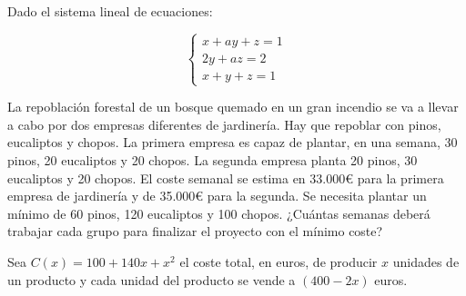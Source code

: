 \documentclass[addpoints,spanish, 12pt,a4paper]{exam}
\begin{document}
\begin{questions}

\question Dado  el sistema lineal de ecuaciones:

$$\left\{\begin{matrix}
    x + ay + z = 1 \\
    2y + az = 2 \\
    x+y+z=1
\end{matrix}\right.$$


\question[4] La repoblación forestal de un bosque quemado en un gran incendio se va
a llevar a cabo por dos empresas diferentes de jardinería. Hay que repoblar con pinos, eucaliptos
y chopos. La primera empresa es capaz de plantar, en una semana, 30 pinos, 20 eucaliptos y 20
chopos. La segunda empresa planta 20 pinos, 30 eucaliptos y 20 chopos. El coste semanal se
estima en 33.000€ para la primera empresa de jardinería y de 35.000€ para la segunda. Se necesita
plantar un mínimo de 60 pinos, 120 eucaliptos y 100 chopos. ¿Cuántas semanas deberá trabajar
cada grupo para finalizar el proyecto con el mínimo coste?
\begin{solution}
    
\end{solution}

\question Sea $C(x)=100+140x+x^2$ el coste total, en euros, de producir $x$ unidades de un
producto y cada unidad del producto se vende a $(400-2x)$ euros.
\begin{parts}

\end{parts}
\end{questions}
\end{document}
